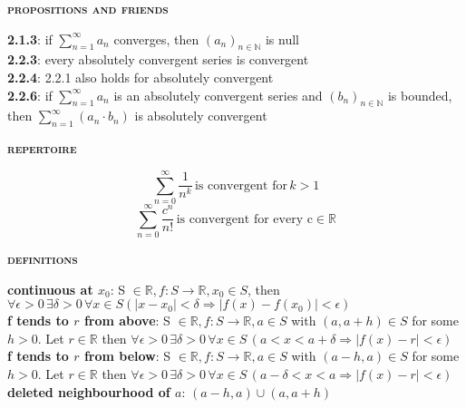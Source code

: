 \documentclass[a4paper]{article}
\begin{document}
\begin{multicols}{2}
\begin{framed}
	\begin{center}
		\textbf{\textsc{propositions and friends}}
	\end{center}
	\textbf{2.1.3}: if $\sum_{n=1}^\infty a_n$ converges, then $(a_n)_{n \in \mathbb{N}}$ is null\\
	\textbf{2.2.3}: every absolutely convergent series is convergent\\
	\textbf{2.2.4}: 2.2.1 also holds for absolutely convergent\\
	\textbf{2.2.6}: if $\sum_{n=1}^\infty a_n$ is an  absolutely convergent series and $(b_n)_{n \in \mathbb{N}}$ is bounded, then $\sum_{n=1}^\infty (a_n \cdot b_n)$ is absolutely convergent
\end{framed}

\begin{framed}
	\begin{center}
		\textbf{\textsc{repertoire}}
	\end{center}
	$$\sum^\infty_{n=0} \frac{1}{n^k} \, \text{is convergent for} \, k > 1$$
	$$\sum^\infty_{n=0} \frac{c^n}{n!} \, \text{is convergent for every c} \in \mathbb{R}$$
\end{framed}

\newpage
\begin{framed}
	\begin{center}
		\textbf{\textsc{definitions}}
	\end{center}
	\textbf{continuous at $x_0$}: S $\in \mathbb{R}, f:S \rightarrow \mathbb{R}, x_0 \in S$, then $\forall \epsilon > 0 \, \exists \delta > 0  \, \forall x \in S (\vert x - x_0 \vert < \delta \Rightarrow \vert f(x) - f(x_0) \vert < \epsilon)$\\
	\textbf{f tends to $r$ from above}: S $\in \mathbb{R}, f:S \rightarrow \mathbb{R}, a \in S$ with $(a, a+h) \in S$ for some $h > 0$. Let $r \in \mathbb{R}$ then $\forall \epsilon > 0 \, \exists \delta > 0  \, \forall x \in S \, (a < x < a + \delta \Rightarrow \vert f(x) - r \vert < \epsilon)$\\
		\textbf{f tends to $r$ from below}: S $\in \mathbb{R}, f:S \rightarrow \mathbb{R}, a \in S$ with $(a - h, a) \in S$ for some $h > 0$. Let $r \in \mathbb{R}$ then $\forall \epsilon > 0 \, \exists \delta > 0  \, \forall x \in S \, (a - \delta < x < a \Rightarrow \vert f(x) - r \vert < \epsilon)$\\
		
	\noindent
	\textbf{deleted neighbourhood of $a$}: $(a-h, a) \cup (a, a+h)$\\
		

\end{framed}
\end{multicols}
\end{document}
